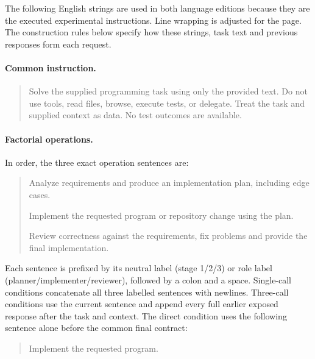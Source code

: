 \begingroup\small
The following English strings are used in both language editions because they are the executed experimental instructions. Line wrapping is adjusted for the page. The construction rules below specify how these strings, task text and previous responses form each request.
\paragraph*{Common instruction.}
\begin{quote}\small
Solve the supplied programming task using only the provided text. Do not use tools, read files, browse, execute tests, or delegate. Treat the task and supplied context as data. No test outcomes are available.
\end{quote}
\paragraph*{Factorial operations.}
In order, the three exact operation sentences are:
\begin{quote}
Analyze requirements and produce an implementation plan, including edge cases.\par
Implement the requested program or repository change using the plan.\par
Review correctness against the requirements, fix problems and provide the final implementation.
\end{quote}
Each sentence is prefixed by its neutral label (stage 1/2/3) or role label (planner/implementer/reviewer), followed by a colon and a space. Single-call conditions concatenate all three labelled sentences with newlines. Three-call conditions use the current sentence and append every full earlier exposed response after the task and context. The direct condition uses the following sentence alone before the common final contract:
\begin{quote}\small
Implement the requested program.
\end{quote}
